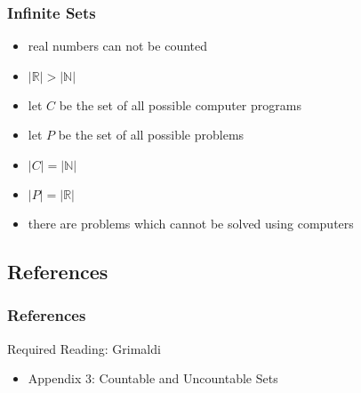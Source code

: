 \documentclass[dvipsnames]{beamer}
\begin{document}
\begin{frame}
  \frametitle{Infinite Sets}

  \begin{itemize}
    \item real numbers can not be counted
    \item $|\mathbb{R}| > |\mathbb{N}|$

    \pause
    \medskip
    \item let $C$ be the set of all possible computer programs
    \item let $P$ be the set of all possible problems
    \item $|C| = |\mathbb{N}|$
    \item $|P| = |\mathbb{R}|$

    \pause
    \medskip
    \item there are problems which cannot be solved using computers
  \end{itemize}
\end{frame}

\subsection*{References}

\begin{frame}
  \frametitle{References}

  \begin{block}{Required Reading: Grimaldi}
    \begin{itemize}
      \item Appendix 3: \alert{Countable and Uncountable Sets}
    \end{itemize}
  \end{block}
\end{frame}
\end{document}
